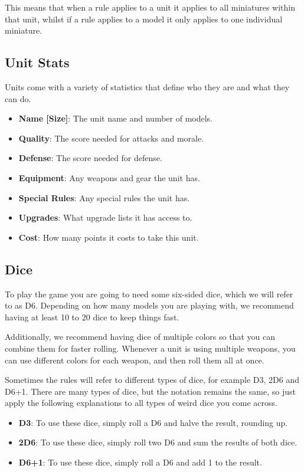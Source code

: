 \documentclass[9pt, a4paper]{extarticle}            %
\begin{document}
\begin{multicols}{2}
This means that when a rule applies to a unit it applies to all miniatures within that unit, whilst if a rule applies to a model it only applies to one individual miniature.

\subsection{Unit Stats}

Units come with a variety of statistics that define who they are and what they can do.

\begin{itemize}
  \item \textbf{Name [Size]}: The unit name and number of models.
  \item \textbf{Quality}: The score needed for attacks and morale.
  \item \textbf{Defense}: The score needed for defense.
  \item \textbf{Equipment}: Any weapons and gear the unit has.
  \item \textbf{Special Rules}: Any special rules the unit has.
  \item \textbf{Upgrades}: What upgrade lists it has access to.
  \item \textbf{Cost}: How many points it costs to take this unit.
\end{itemize}

\columnbreak

\subsection{Dice}

To play the game you are going to need some six-sided dice, which we will refer to as D6. Depending on how many models you are playing with, we recommend having at least 10 to 20 dice to keep things fast.

Additionally, we recommend having dice of multiple colors so that you can combine them for faster rolling. Whenever a unit is using multiple weapons, you can use different colors for each weapon, and then roll them all at once.

Sometimes the rules will refer to different types of dice, for example D3, 2D6 and D6+1. There are many types of dice, but the notation remains the same, so just apply the following explanations to all types of weird dice you come across.
\begin{itemize}
  \item \textbf{D3}: To use these dice, simply roll a D6 and halve the result, rounding up.
  \item \textbf{2D6}: To use these dice, simply roll two D6 and sum the results of both dice.
  \item \textbf{D6+1}: To use these dice, simply roll a D6 and add 1 to the result.
\end{itemize}


\end{multicols}
\end{document}
